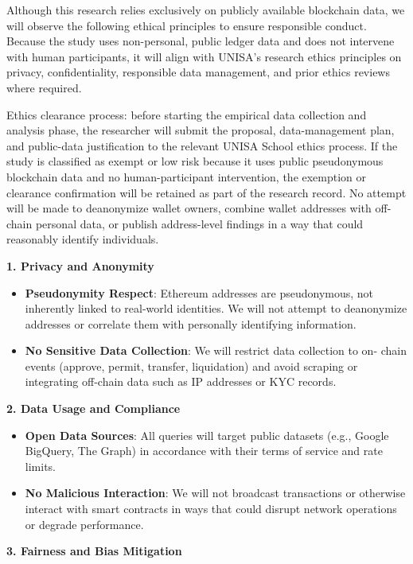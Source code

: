 \documentclass[12pt]{article}
\newcommand{\proposalSubheading}[1]{%
  \par\addvspace{0.38\baselineskip}%
  \noindent\textbf{#1}\par\nobreak\addvspace{0.08\baselineskip}%
}
\begin{document}
Although this research relies exclusively on publicly available blockchain data, we will observe the following ethical principles to ensure responsible conduct. Because the study uses non-personal, public ledger data and does not intervene with human participants, it will align with UNISA's research ethics principles on privacy, confidentiality, responsible data management, and prior ethics reviews where required.


Ethics clearance process: before starting the empirical data collection and analysis phase, the researcher will submit the proposal, data-management plan, and public-data justification to the relevant UNISA School ethics process. If the study is classified as exempt or low risk because it uses public pseudonymous blockchain data and no human-participant intervention, the exemption or clearance confirmation will be retained as part of the research record. No attempt will be made to deanonymize wallet owners, combine wallet addresses with off-chain personal data, or publish address-level findings in a way that could reasonably identify individuals.


\proposalSubheading{1. Privacy and Anonymity}

\begin{itemize}
\item[\textbullet] \textbf{Pseudonymity Respect}: Ethereum addresses are pseudonymous, not inherently linked to real-world identities. We will not attempt to deanonymize addresses or correlate them with personally identifying information.
\item[\textbullet] \textbf{No Sensitive Data Collection}: We will restrict data collection to on- chain events (approve, permit, transfer, liquidation) and avoid scraping or integrating off-chain data such as IP addresses or KYC records.
\end{itemize}
\proposalSubheading{2. Data Usage and Compliance}

\begin{itemize}
\item[\textbullet] \textbf{Open Data Sources}: All queries will target public datasets (e.g., Google BigQuery, The Graph) in accordance with their terms of service and rate limits.
\item[\textbullet] \textbf{No Malicious Interaction}: We will not broadcast transactions or otherwise interact with smart contracts in ways that could disrupt network operations or degrade performance.
\end{itemize}
\proposalSubheading{3. Fairness and Bias Mitigation}
\end{document}
